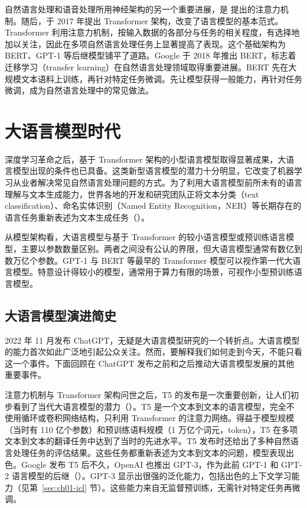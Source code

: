 自然语言处理和语音处理所用神经架构的另一个重要进展，是 提出的注意力机制。随后，于 2017 年提出 Transformer 架构，改变了语言模型的基本范式。Transformer 利用注意力机制，按输入数据的各部分与任务的相关程度，有选择地加以关注，因此在多项自然语言处理任务上显著提高了表现。这个基础架构为 BERT、GPT-1 等后继模型铺平了道路。Google 于 2018 年推出 BERT，标志着迁移学习（transfer learning）在自然语言处理领域取得重要进展。BERT 先在大规模文本语料上训练，再针对特定任务微调。先让模型获得一般能力，再针对任务微调，成为自然语言处理中的常见做法。

\section{大语言模型时代}
深度学习革命之后，基于 Transformer 架构的小型语言模型取得显著成果，大语言模型出现的条件也已具备。这类新型语言模型的潜力十分明显，它改变了机器学习从业者解决常见自然语言处理问题的方式。为了利用大语言模型前所未有的语言理解与文本生成能力，世界各地的开发和研究团队正将文本分类（text classification）、命名实体识别（Named Entity Recognition，NER）等长期存在的语言任务重新表述为文本生成任务（）。

\begin{practicaltip}
从模型架构看，大语言模型与基于 Transformer 的较小语言模型或预训练语言模型，主要以参数数量区别。两者之间没有公认的界限，但大语言模型通常有数亿到数万亿个参数。GPT-1 与 BERT 等最早的 Transformer 模型可以视作第一代大语言模型。特意设计得较小的模型，通常用于算力有限的场景，可视作小型预训练语言模型。
\end{practicaltip}

\subsection{大语言模型演进简史}
2022 年 11 月发布 ChatGPT，无疑是大语言模型研究的一个转折点。大语言模型的能力首次如此广泛地引起公众关注。然而，要解释我们如何走到今天，不能只看这一个事件。下面回顾在 ChatGPT 发布之前和之后推动大语言模型发展的其他重要事件。

注意力机制与 Transformer 架构问世之后，T5 的发布是一次重要创新，让人们初步看到了当代大语言模型的潜力（）。T5 是一个文本到文本的语言模型，完全不使用循环或卷积网络结构，只利用 Transformer 的注意力网络。得益于模型规模（当时有 110 亿个参数）和预训练语料规模（1 万亿个词元，token），T5 在多项文本到文本的翻译任务中达到了当时的先进水平。T5 发布时还给出了多种自然语言处理任务的评估结果。这些任务都重新表述为文本到文本的问题，模型表现出色。Google 发布 T5 后不久，OpenAI 也推出 GPT-3，作为此前 GPT-1 和 GPT-2 语言模型的后继（）。GPT-3 显示出很强的泛化能力，包括出色的上下文学习能力（见第~\ref{sec:ch01-icl} 节）。这些能力来自无监督预训练，无需针对特定任务再微调。


